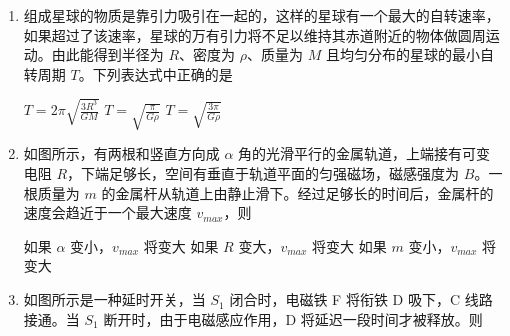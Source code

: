 \documentclass[\gkver]{gaokaozhenti}
\begin{document}
\begin{enumerate}
\item
组成星球的物质是靠引力吸引在一起的，这样的星球有一个最大的自转速率，如果超过了该速率，星球的万有引力将不足以维持其赤道附近的物体做圆周运动。由此能得到半径为 $R$、密度为 $\rho$、质量为 $M$ 且均匀分布的星球的最小自转周期 $T$。下列表达式中正确的是

{$T=2\pi\sqrt{\frac{3R^{3}}{GM}}$}
{$T=\sqrt{\frac{\pi}{G\rho}}$}
{$T=\sqrt{\frac{3\pi}{G\rho}}$}


\item
如图所示，有两根和竖直方向成 $\alpha$ 角的光滑平行的金属轨道，上端接有可变电阻 $R$，下端足够长，空间有垂直于轨道平面的匀强磁场，磁感强度为 $B$。一根质量为 $m$ 的金属杆从轨道上由静止滑下。经过足够长的时间后，金属杆的速度会趋近于一个最大速度 $v_{max}$，则

\onepicture[align=right, w=4.56cm]{}

{如果 $\alpha$ 变小，$v_{max}$ 将变大}
{如果 $R$ 变大，$v_{max}$ 将变大}
{如果 $m$ 变小，$v_{max}$ 将变大}


\item
如图所示是一种延时开关，当 $S_{1}$ 闭合时，电磁铁 F 将衔铁 D 吸下，C 线路接通。当 $S_{1}$ 断开时，由于电磁感应作用，D 将延迟一段时间才被释放。则


\end{enumerate}
\end{document}
